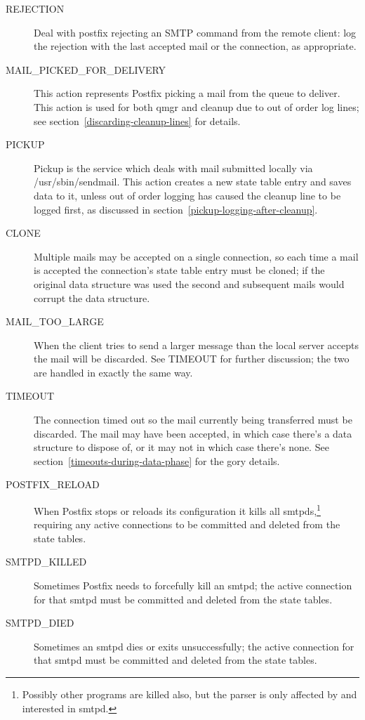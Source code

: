 \documentclass[a4paper,12pt,draft]{article}
\begin{document}
\begin{description}
    \item [REJECTION] Deal with postfix rejecting an SMTP command from the
        remote client: log the rejection with the last accepted mail or the
        connection, as appropriate.

    \item [MAIL\_PICKED\_FOR\_DELIVERY] This action represents Postfix
        picking a mail from the queue to deliver. This action is used for
        both qmgr and cleanup due to out of order log lines; see
        section~\ref{discarding-cleanup-lines} for details.

    \item [PICKUP] Pickup is the service which deals with mail submitted
        locally via /usr/sbin/sendmail. This action creates a new state
        table entry and saves data to it, unless out of order logging has
        caused the cleanup line to be logged first, as discussed in
        section~\ref{pickup-logging-after-cleanup}.

    \item [CLONE] Multiple mails may be accepted on a single connection, so
        each time a mail is accepted the connection's state table entry
        must be cloned; if the original data structure was used the second
        and subsequent mails would corrupt the data structure.

    \item [MAIL\_TOO\_LARGE] When the client tries to send a larger message
        than the local server accepts the mail will be discarded.  See
        TIMEOUT for further discussion; the two are handled in exactly the
        same way.

    \item [TIMEOUT] The connection timed out so the mail currently being
        transferred must be discarded. The mail may have been accepted, in
        which case there's a data structure to dispose of, or it may not in
        which case there's none. See
        section~\ref{timeouts-during-data-phase} for the gory details.

    \item [POSTFIX\_RELOAD] When Postfix stops or reloads its configuration
        it kills all smtpds,\footnote{Possibly other programs are killed
        also, but the parser is only affected by and interested in smtpd.}
        requiring any active connections to be committed and deleted from
        the state tables.

    \item [SMTPD\_KILLED] Sometimes Postfix needs to forcefully kill an
        smtpd; the active connection for that smtpd must be committed and
        deleted from the state tables.

    \item [SMTPD\_DIED] Sometimes an smtpd dies or exits unsuccessfully;
        the active connection for that smtpd must be committed and deleted
        from the state tables.

\end{description}
\end{document}
